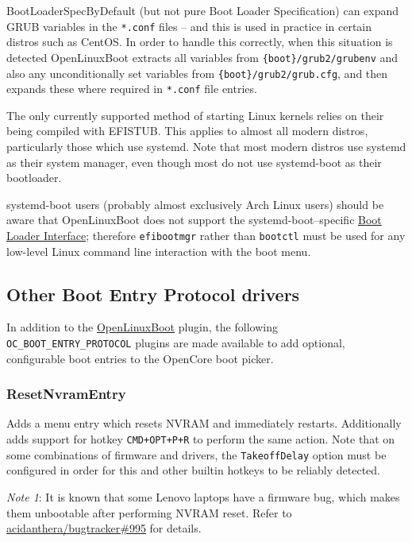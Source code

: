 \documentclass[]{article}
\makeatletter
\renewcommand{\label}[1]{%
\zref@wrapper@immediate{\oldlabel{#1}}}  %
\makeatother
\begin{document}
BootLoaderSpecByDefault (but not pure Boot Loader Specification) can expand GRUB variables
in the \texttt{*.conf} files -- and this is used in practice in certain distros such as CentOS.
In order to handle this correctly, when this situation is detected OpenLinuxBoot extracts all variables from
\texttt{\{boot\}/grub2/grubenv} and also any unconditionally set variables from
\texttt{\{boot\}/grub2/grub.cfg}, and then expands these where required in \texttt{*.conf} file entries.

The only currently supported method of starting Linux kernels relies on their being compiled with EFISTUB.
This applies to almost all modern distros, particularly those which use systemd. Note that most modern
distros use systemd as their system manager, even though most do not use systemd-boot as
their bootloader.

systemd-boot users (probably almost exclusively Arch Linux users) should be aware that OpenLinuxBoot
does not support the systemd-boot--specific \href{https://systemd.io/BOOT\_LOADER\_INTERFACE/}{Boot Loader Interface};
therefore \texttt{efibootmgr} rather than \texttt{bootctl} must be used for any low-level Linux command line interaction
with the boot menu.

\subsection{Other Boot Entry Protocol drivers}

In addition to the \hyperref[uefilinux]{OpenLinuxBoot} plugin, the following \texttt{OC\_BOOT\_ENTRY\_PROTOCOL}
plugins are made available to add optional, configurable boot entries to the OpenCore boot picker.

\subsubsection{ResetNvramEntry}\label{uefiresetnvram}

Adds a menu entry which resets NVRAM and immediately restarts. Additionally adds support for hotkey
\texttt{CMD+OPT+P+R} to perform the same action. Note that on some combinations of firmware and
drivers, the \texttt{TakeoffDelay} option must be configured in order for this
and other builtin hotkeys to be reliably detected.

\emph{Note 1}: It is known that some Lenovo laptops have a firmware
bug, which makes them unbootable after performing NVRAM reset. Refer to
\href{https://github.com/acidanthera/bugtracker/issues/995}{acidanthera/bugtracker\#995}
for details.
\end{document}

